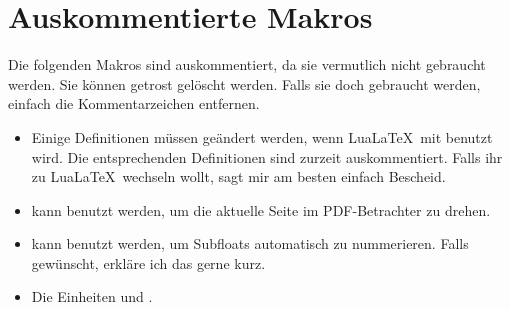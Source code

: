 \section{Auskommentierte Makros}
Die folgenden Makros sind auskommentiert, da sie vermutlich nicht gebraucht werden.
Sie können getrost gelöscht werden.
Falls sie doch gebraucht werden, einfach die Kommentarzeichen entfernen.
\begin{itemize}
  \item Einige Definitionen müssen geändert werden, wenn Lua\LaTeX\ mit  benutzt wird.
    Die entsprechenden Definitionen sind zurzeit auskommentiert.
    Falls ihr zu Lua\LaTeX\ wechseln wollt, sagt mir am besten einfach Bescheid.
  
  \item \texttt{\string\thispagepdflscape} kann benutzt werden, um die aktuelle Seite im PDF-Betrachter zu drehen.
  
  \item \texttt{\string\tagsubfloats} kann benutzt werden, um Subfloats automatisch zu nummerieren.
    Falls gewünscht, erkläre ich das gerne kurz.
    
  \item Die Einheiten \texttt{\string\dBm} und \texttt{\string\Phizero}.
\end{itemize}

\makedocumentend


